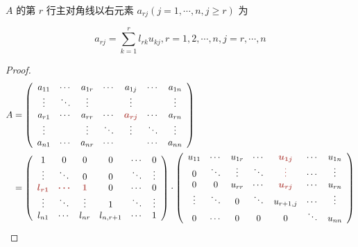\begin{theorem}
    $ A $ 的第 $ r $ 行主对角线以右元素 $ a_{r j}(j=1, \cdots, n, j \ge r) $ 为

    \begin{equation}a_{r j}=\sum_{k=1}^{r} l_{r k} u_{k j}, r=1,2, \cdots, n,j=r, \cdots, n \end{equation}
\end{theorem}

\begin{proof}
    \begin{equation}
        \begin{aligned}
            A & =\left(\begin{array}{ c c c c c c c }
            a_{11} & \cdots  & a_{1r} & \cdots  & a_{1j} & \cdots  & a_{1n}\\
            \vdots  & \ddots  & \vdots  &  & \vdots  &  & \vdots \\
            a_{r1} & \cdots  & a_{rr} & \cdots  & \boldsymbol{\textcolor[rgb]{0.72,0.33,0.31}{a}\textcolor[rgb]{0.72,0.33,0.31}{_{rj}}} & \cdots  & a_{rn}\\
            \vdots  &  & \vdots  & \ddots  & \vdots  & \ddots  & \vdots \\
            a_{n1} & \cdots  & a_{nr} & \cdots  &  & \cdots  & a_{nn}
            \end{array}\right)\\
             & =\left(\begin{array}{ c c c c c c }
            1 & 0 & 0 & 0 & \cdots  & 0\\
            \vdots  & \ddots  & 0 & 0 & \ddots  & \vdots \\
            \boldsymbol{\textcolor[rgb]{0.72,0.33,0.31}{l}\textcolor[rgb]{0.72,0.33,0.31}{_{r1}}} & \boldsymbol{\textcolor[rgb]{0.72,0.33,0.31}{\cdots }} & \boldsymbol{\textcolor[rgb]{0.72,0.33,0.31}{1}} & 0 & \cdots  & 0\\
            \vdots  & \ddots  & \vdots  & 1 & \ddots  & \vdots \\
            l_{n1} & \cdots  & l_{nr} & l_{n,r+1} & \cdots  & 1
            \end{array}\right) \cdot \left(\begin{array}{ c c c c c c c }
            u_{11} & \cdots  & u_{1r} & \cdots  & \boldsymbol{\textcolor[rgb]{0.72,0.33,0.31}{u}\textcolor[rgb]{0.72,0.33,0.31}{_{1j}}} & \cdots  & u_{1n}\\
            0 & \ddots  & \vdots  & \ddots  & \boldsymbol{\textcolor[rgb]{0.72,0.33,0.31}{\vdots }} & \cdots  & \vdots \\
            0 & 0 & u_{rr} & \cdots  & \boldsymbol{\textcolor[rgb]{0.72,0.33,0.31}{u}\textcolor[rgb]{0.72,0.33,0.31}{_{rj}}} & \cdots  & u_{rn}\\
            \vdots  & \ddots  & 0 & \ddots  & u_{r+1,j} & \cdots  & \vdots \\
            0 & \cdots  & 0 & 0 & 0 & \ddots  & u_{nn}
            \end{array}\right)
            \end{aligned}
    \end{equation}
\end{proof}


